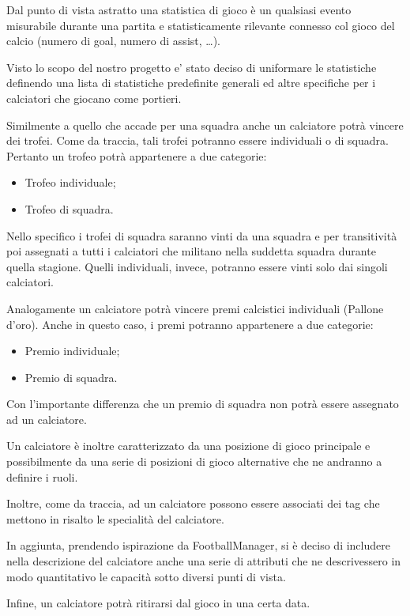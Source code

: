 Dal punto di vista astratto una statistica di gioco è un qualsiasi evento misurabile durante
una partita e statisticamente rilevante connesso col gioco del calcio
(numero di goal, numero di assist, \dots).

Visto lo scopo del nostro progetto e' stato deciso di uniformare le statistiche definendo una
lista di statistiche predefinite generali ed altre specifiche per i calciatori che giocano
come portieri.

Similmente a quello che accade per una squadra anche un calciatore potrà vincere dei trofei.
Come da traccia, tali trofei potranno essere individuali o di squadra.
Pertanto un trofeo potrà appartenere a due categorie:
\begin{itemize}
	\item Trofeo individuale;
	\item Trofeo di squadra.
\end{itemize}

Nello specifico i trofei di squadra saranno vinti da una squadra e per transitività poi
assegnati a tutti i calciatori che militano nella suddetta squadra durante quella stagione.
Quelli individuali, invece, potranno essere vinti solo dai singoli calciatori.

Analogamente un calciatore potrà vincere premi calcistici individuali (Pallone d'oro).
Anche in questo caso, i premi potranno appartenere a due categorie:
\begin{itemize}
	\item Premio individuale;
	\item Premio di squadra.
\end{itemize}

Con l'importante differenza che un premio di squadra non potrà essere assegnato ad un
calciatore.

Un calciatore è inoltre caratterizzato da una posizione di gioco principale e possibilmente da una
serie di posizioni di gioco alternative che ne andranno a definire i ruoli.

Inoltre, come da traccia, ad un calciatore possono essere associati dei tag che mettono in
risalto le specialità del calciatore.

In aggiunta, prendendo ispirazione da FootballManager, si è deciso di includere nella
descrizione del calciatore anche una serie di attributi che ne descrivessero in modo quantitativo
le capacità sotto diversi punti di vista.

Infine, un calciatore potrà ritirarsi dal gioco in una certa data.

